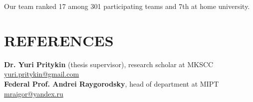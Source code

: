 \documentclass[11pt]{res}
\newcommand{\vmarginsmall}{\vspace{0.1cm}}
\newcommand{\vmargin}{\vspace{0.3cm}}
\begin{document}
\begin{resume}
\hphantom{-} Our team ranked 17 among 301 participating teams and 7th at home university.\vmarginsmall\\
\section{REFERENCES} 
\vspace{0.1cm}
\textbf{Dr. Yuri Pritykin} (thesis supervisor), research scholar at MKSCC \hfill\href{mailto://yuri.pritykin@gmail.com}{yuri.pritykin@gmail.com}\\ 
\textbf{Federal Prof. Andrei Raygorodsky}, head of department at MIPT \hfill\href{mailto://mraigor@yandex.ru}{mraigor@yandex.ru}
\end{resume}
\end{document}
